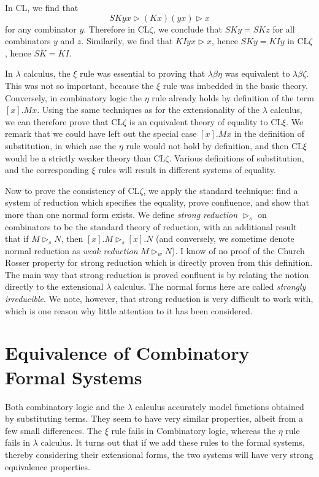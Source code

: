 \begin{example}
    In $\text{CL}$, we find that
    \[ SKyx \rhd (Kx)(yx) \rhd x \]
    for any combinator $y$. Therefore in $\text{CL} \zeta$, we conclude that $SKy = SKz$ for all combinators $y$ and $z$. Similarily, we find that $KIyx \rhd x$, hence $SKy = KIy$ in $\text{CL} \zeta$, hence $SK = KI$.
\end{example}

In $\lambda$ calculus, the $\xi$ rule was essential to proving that $\lambda \beta \eta$ was equivalent to $\lambda \beta \zeta$. This was not so important, because the $\xi$ rule was imbedded in the basic theory. Conversely, in combinatory logic the $\eta$ rule already holds by definition of the term $[x].Mx$. Using the same techniques as for the extensionality of the $\lambda$ calculus, we can therefore prove that $\text{CL} \zeta$ is an equivalent theory of equality to $\text{CL} \xi$. We remark that we could have left out the special case $[x].Mx$ in the definition of substitution, in which ase the $\eta$ rule would not hold by definition, and then $\text{CL} \xi$ would be a strictly weaker theory than $\text{CL} \zeta$. Various definitions of substitution, and the corresponding $\xi$ rules will result in different systems of equality.

Now to prove the consistency of $\text{CL} \zeta$, we apply the standard technique: find a system of reduction which specifies the equality, prove confluence, and show that more than one normal form exists. We define \emph{strong reduction} $\rhd_s$ on combinators to be the standard theory of reduction, with an additional result that if $M \rhd_s N$, then $[x].M \rhd_s [x].N$ (and conversely, we sometime denote normal reduction as {\it weak reduction} $M \rhd_w N$). I know of no proof of the Church Rosser property for strong reduction which is directly proven from this definition. The main way that strong reduction is proved confluent is by relating the notion directly to the extensional $\lambda$ calculus. The normal forms here are called \emph{strongly irreducible}. We note, however, that strong reduction is very difficult to work with, which is one reason why little attention to it has been considered.

\section{Equivalence of Combinatory Formal Systems}

Both combinatory logic and the $\lambda$ calculus accurately model functions obtained by substituting terms. They seem to have very similar properties, albeit from a few small differences. The $\xi$ rule fails in Combinatory logic, whereas the $\eta$ rule fails in $\lambda$ calculus. It turns out that if we add these rules to the formal systems, thereby considering their extensional forms, the two systems will have very strong equivalence properties.

